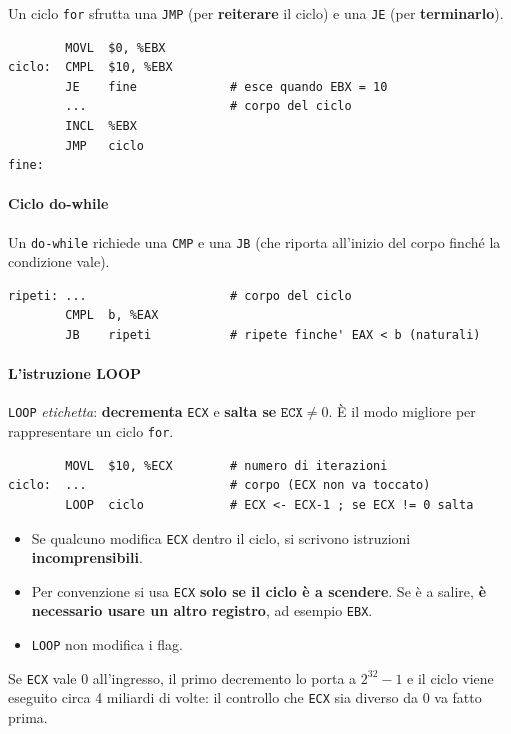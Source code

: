 \documentclass[11pt,a4paper]{article}
\begin{document}
Un ciclo \texttt{for} sfrutta una \texttt{JMP} (per \textbf{reiterare} il ciclo) e una \texttt{JE} (per \textbf{terminarlo}).
\begin{lstlisting}
        MOVL  $0, %EBX
ciclo:  CMPL  $10, %EBX
        JE    fine             # esce quando EBX = 10
        ...                    # corpo del ciclo
        INCL  %EBX
        JMP   ciclo
fine:
\end{lstlisting}

\paragraph*{Ciclo do-while}

Un \texttt{do-while} richiede una \texttt{CMP} e una \texttt{JB} (che riporta all'inizio del corpo finché la condizione vale).
\begin{lstlisting}
ripeti: ...                    # corpo del ciclo
        CMPL  b, %EAX
        JB    ripeti           # ripete finche' EAX < b (naturali)
\end{lstlisting}

\paragraph*{L'istruzione LOOP}

\texttt{LOOP} \emph{etichetta}: \textbf{decrementa} \texttt{ECX} e \textbf{salta se} $\texttt{ECX}\neq 0$. È il modo migliore per rappresentare un ciclo \texttt{for}.

\begin{lstlisting}
        MOVL  $10, %ECX        # numero di iterazioni
ciclo:  ...                    # corpo (ECX non va toccato)
        LOOP  ciclo            # ECX <- ECX-1 ; se ECX != 0 salta
\end{lstlisting}

\begin{itemize}[leftmargin=*]
  \item Se qualcuno modifica \texttt{ECX} dentro il ciclo, si scrivono istruzioni \textbf{incomprensibili}.
  \item Per convenzione si usa \texttt{ECX} \textbf{solo se il ciclo è a scendere}. Se è a salire, \textbf{è necessario usare un altro registro}, ad esempio \texttt{EBX}.
  \item \texttt{LOOP} non modifica i flag.
\end{itemize}

\begin{integrazione}
Se \texttt{ECX} vale 0 all'ingresso, il primo decremento lo porta a $2^{32}-1$ e il ciclo viene eseguito circa 4 miliardi di volte: il controllo che \texttt{ECX} sia diverso da 0 va fatto prima.
\end{integrazione}
\end{document}

